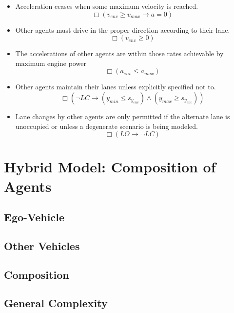 \documentclass{easychair}
\theoremstyle{theorem}
\theoremstyle{remark}
\begin{document}
\begin{itemize}
	\item Acceleration ceases when some maximum velocity is reached.
	\begin{equation}
	\Box \left( v_{env} \geq v_{max} \to a = 0 \right)
	\end{equation}
	\item Other agents must drive in the proper direction according to their lane.
	\begin{equation}
	\Box \left( v_{env} \geq 0 \right)
	\end{equation}
	\item The accelerations of other agents are within those rates achievable by maximum engine power
	\begin{equation}
	\Box \left( a_{env} \leq a_{max}\right)
	\end{equation}
	\item Other agents maintain their lanes unless explicitly specified not to.
	\begin{equation}
	\Box \left( \neg LC \to \left( y_{min} \leq s_{y_{env}} \right) \wedge \left( y_{max} \geq s_{y_{env}} \right) \right)
	\end{equation}
	\item Lane changes by other agents are only permitted if the alternate lane is unoccupied or unless a degenerate scenario is being modeled.
	\begin{equation}
	\Box \left( LO \to \neg LC \right)
	\end{equation}
	

	
\end{itemize}

\section{Hybrid Model: Composition of Agents}
\subsection{Ego-Vehicle}
\subsection{Other Vehicles}
\subsection{Composition}
\subsection{General Complexity}
\end{document}
